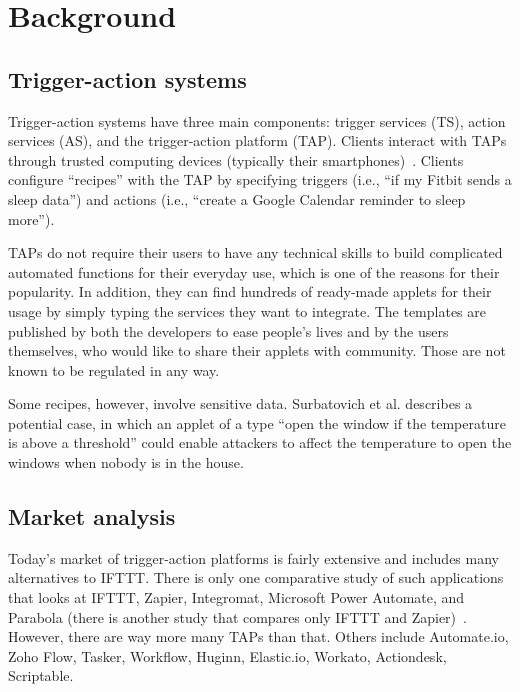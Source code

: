 \section{Background}
\label{sec:background}

\subsection{Trigger-action systems}

Trigger-action systems have three main components: trigger services (TS), action
services (AS), and the trigger-action platform (TAP). Clients interact with TAPs
through trusted computing devices (typically their
smartphones)~\cite{DBLP:conf/sp/ChenCWSCF21}. Clients configure ``recipes'' with
the TAP by specifying triggers (i.e., ``if my Fitbit sends a sleep data'') and
actions (i.e., ``create a Google Calendar reminder to sleep more''). 

 TAPs do not require their users to have any technical
skills to build complicated automated functions for their everyday use, which is
one of the reasons for their popularity. In addition, they can find hundreds of
ready-made applets for their usage by simply typing the services they want to
integrate. The templates are published by both the developers to ease people's
lives and by the users themselves, who would like to share their applets with
community. Those are not known to be regulated in any way.

Some recipes, however, involve sensitive data. Surbatovich et al.
describes a potential case, in which an applet of a type ``open the window if
the temperature is above a threshold'' could enable attackers to affect the
temperature to open the windows when nobody is in the house.


\subsection{Market analysis}
Today's market of trigger-action platforms is fairly extensive and includes many
alternatives to IFTTT.  There is only one comparative study of such applications
that looks at IFTTT, Zapier, Integromat, Microsoft Power Automate, and Parabola
(there is another study that compares only IFTTT and
Zapier)~\cite{DBLP:conf/icict2/AbdouEF21}. However, there are way more many TAPs
than that. Others include Automate.io, Zoho Flow, Tasker, Workflow, Huginn,
Elastic.io, Workato, Actiondesk, Scriptable.

